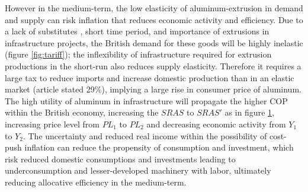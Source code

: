 \documentclass[a4paper,12pt]{article}
\newcommand{\tikzfig}[1]{}
\begin{document}


\begin{figure}[H]
    \centering
    \tikzfig{assets/eco.txt}
    \caption{}
    \label{fig:eco}
\end{figure}
However in the medium-term, the low elasticity of aluminum-extrusion in demand and supply can risk inflation that reduces economic activity and efficiency. Due to a lack of substitutes \parencite{statista}, short time period, and importance of extrusions in infrastructure projects, the British demand for these goods will be highly inelastic (figure \ref{fig:tariff}); the inflexibility of infrastructure required for extrusion productions in the short-run also reduces supply elasticity. Therefore it requires a large tax to reduce imports and increase domestic production than in an elastic market (article stated 29\%), implying a large rise in consumer price of aluminum. The high utility of aluminum in infrastructure will propagate the higher COP within the British economy, increasing the $SRAS$ to $SRAS'$ as in figure \ref{fig:eco},
increasing price level from $PL_1$ to $PL_2$ and decreasing economic activity from $Y_1$ to $Y_2$. The uncertainty and reduced real income within the possibility of cost-push inflation can reduce the propensity of consumption and investment, which risk reduced domestic consumptions and investments leading to underconsumption and lesser-developed machinery with labor, ultimately reducing allocative efficiency in the medium-term.


\begin{figure}[H]
    \centering
    \tikzfig{assets/re.txt}
    \caption{}
    \label{fig:forex}
\end{figure}
\end{document}
